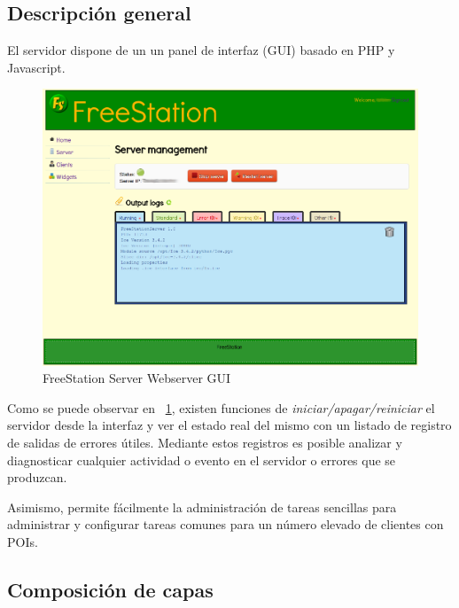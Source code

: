 \subsection{Descripción general}

El servidor dispone de un un panel de interfaz (\acs{GUI}\label{acro:GUI})
basado en PHP y Javascript.

\begin{figure}[h]
    \begin{center}
        \includegraphics[scale=0.45]{src/img/freestation-server-gui.png}
        \caption[FreeStation Server Webserver GUI] {FreeStation Server Webserver GUI}
        \label{fig:serverGUI}
    \end{center}
\end{figure}

\newpage

Como se puede observar en ~\ref{fig:serverGUI}, existen funciones de
\emph{iniciar/apagar/reiniciar} el servidor desde la interfaz y ver el estado
real del mismo con un listado de registro de salidas de errores útiles. Mediante estos
registros es posible analizar y diagnosticar cualquier actividad o evento en el
servidor o errores que se produzcan.

Asimismo, permite fácilmente la administración de tareas sencillas para
administrar y configurar tareas comunes para un número elevado de clientes con
POIs.

\subsection{Composición de capas}

